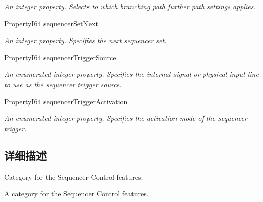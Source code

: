 \begin{DoxyCompactItemize}
\begin{DoxyCompactList}\small\item\em An integer property. Selects to which branching path further path settings applies. \end{DoxyCompactList}\item 
\hyperlink{group___common_interface_ga81749b2696755513663492664a18a893}{Property\+I64} \hyperlink{classmv_i_m_p_a_c_t_1_1acquire_1_1_gen_i_cam_1_1_sequencer_control_adfee8f4bf16d10c0298e42b9c886cdb1}{sequencer\+Set\+Next}
\begin{DoxyCompactList}\small\item\em An integer property. Specifies the next sequencer set. \end{DoxyCompactList}\item 
\hyperlink{group___common_interface_ga81749b2696755513663492664a18a893}{Property\+I64} \hyperlink{classmv_i_m_p_a_c_t_1_1acquire_1_1_gen_i_cam_1_1_sequencer_control_a9ae04765c395a9ffdbdbcd8232ebbed2}{sequencer\+Trigger\+Source}
\begin{DoxyCompactList}\small\item\em An enumerated integer property. Specifies the internal signal or physical input line to use as the sequencer trigger source. \end{DoxyCompactList}\item 
\hyperlink{group___common_interface_ga81749b2696755513663492664a18a893}{Property\+I64} \hyperlink{classmv_i_m_p_a_c_t_1_1acquire_1_1_gen_i_cam_1_1_sequencer_control_abf216c266c3d02126daa2d09fc1fe161}{sequencer\+Trigger\+Activation}
\begin{DoxyCompactList}\small\item\em An enumerated integer property. Specifies the activation mode of the sequencer trigger. \end{DoxyCompactList}\end{DoxyCompactItemize}


\subsection{详细描述}
Category for the Sequencer Control features. 

A category for the Sequencer Control features. 

